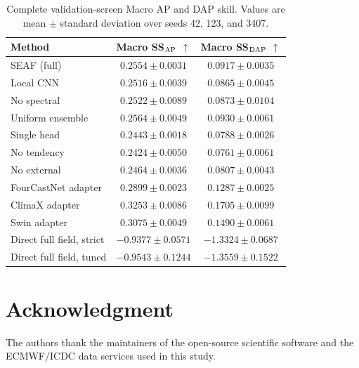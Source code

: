 \documentclass[conference]{IEEEtran}
\begin{document}
\begin{table}[H]
\centering
\caption{Complete validation-screen Macro AP and DAP skill. Values are mean $\pm$ standard deviation over seeds 42, 123, and 3407.}
\label{tab:validation_full}
\scriptsize
\setlength{\tabcolsep}{2.8pt}
\renewcommand{\arraystretch}{1.08}
\begin{tabular}{lcc}
\toprule
Method & Macro SS$_{\rm AP}$ $\uparrow$ & Macro SS$_{\rm DAP}$ $\uparrow$\\
\midrule
\rowcolor{seafblue} SEAF (full) & $0.2554\!\pm\!0.0031$ & $0.0917\!\pm\!0.0035$\\
Local CNN & $0.2516\!\pm\!0.0039$ & $0.0865\!\pm\!0.0045$\\
No spectral & $0.2522\!\pm\!0.0089$ & $0.0873\!\pm\!0.0104$\\
Uniform ensemble & $0.2564\!\pm\!0.0049$ & $0.0930\!\pm\!0.0061$\\
Single head & $0.2443\!\pm\!0.0018$ & $0.0788\!\pm\!0.0026$\\
No tendency & $0.2424\!\pm\!0.0050$ & $0.0761\!\pm\!0.0061$\\
No external & $0.2464\!\pm\!0.0036$ & $0.0807\!\pm\!0.0043$\\
\addlinespace[2pt]
FourCastNet adapter & $0.2899\!\pm\!0.0023$ & $0.1287\!\pm\!0.0025$\\
ClimaX adapter & $0.3253\!\pm\!0.0086$ & $0.1705\!\pm\!0.0099$\\
Swin adapter & $0.3075\!\pm\!0.0049$ & $0.1490\!\pm\!0.0061$\\
\addlinespace[2pt]
\rowcolor{seafwarm} Direct full field, strict & $-0.9377\!\pm\!0.0571$ & $-1.3324\!\pm\!0.0687$\\
\rowcolor{seafwarm} Direct full field, tuned & $-0.9543\!\pm\!0.1244$ & $-1.3559\!\pm\!0.1522$\\
\bottomrule
\end{tabular}
\end{table}
\FloatBarrier

\section*{Acknowledgment}
The authors thank the maintainers of the open-source scientific software and the ECMWF/ICDC data services used in this study.



\end{document}
